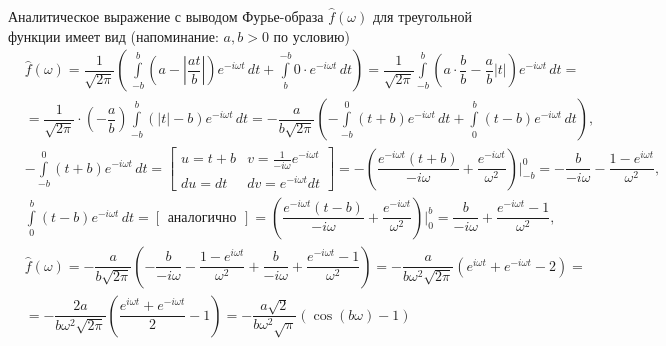 \documentclass[a4paper, 16pt]{article}
\begin{document}
    \noindent Аналитическое выражение с выводом Фурье-образа
    $\hat{f}(\omega)$ для треугольной функции имеет вид (напоминание: $a,b>0$ по условию)
    \begin{align*}
        & \hat{f}(\omega)=\dfrac{1}{\sqrt{2\pi}}\left(\,\int\limits_{-b}^{b}\left(a-\left|\dfrac{at}{b}\right|\right)e^{-i\omega t}\,dt+\int\limits_{b}^{-b}0\cdot e^{-i\omega t}\,dt\right)=
        \dfrac{1}{\sqrt{2\pi}}\int\limits_{-b}^{b}\left(a\cdot\dfrac{b}{b}-\dfrac{a}{b}|t|\right)e^{-i\omega t}\,dt=\\
        & = \dfrac{1}{\sqrt{2\pi}}\cdot\left(-\dfrac{a}{b}\right)\int\limits_{-b}^{b}(|t|-b)e^{-i\omega t}\,dt=-\dfrac{a}{b\sqrt{2\pi}}\left(-\int\limits_{-b}^{0}(t+b)e^{-i\omega t}\,dt+\int\limits_{0}^{b}(t-b)e^{-i\omega t}\,dt\right),\\
        & -\int\limits_{-b}^{0}(t+b)e^{-i\omega t}\,dt=
        \begin{bmatrix}
            u=t+b &v=\frac{1}{-i\omega}e^{-i\omega t}\\
            du=dt &dv=e^{-i\omega t}dt
        \end{bmatrix}=
        -\left(\dfrac{e^{-i\omega t}(t+b)}{-i\omega}+\dfrac{e^{-i\omega t}}{\omega^2}\right)\bigg|_{-b}^{0}=-\dfrac{b}{-i\omega}-\dfrac{1-e^{i\omega t}}{\omega^2},\\
        & \int\limits_{0}^{b}(t-b)e^{-i\omega t}\,dt=
        \begin{bmatrix}
            \text{аналогично}
        \end{bmatrix}=
        \left(\dfrac{e^{-i\omega t}(t-b)}{-i\omega}+\dfrac{e^{-i\omega t}}{\omega^2}\right)\bigg|_{0}^{b}=
        \dfrac{b}{-i\omega}+\dfrac{e^{-i\omega t}-1}{\omega^2},\\
        & \hat{f}(\omega)=-\dfrac{a}{b\sqrt{2\pi}}\left(-\dfrac{b}{-i\omega}-\dfrac{1-e^{i\omega t}}{\omega^2}+\dfrac{b}{-i\omega}+\dfrac{e^{-i\omega t}-1}{\omega^2}\right)=
        -\dfrac{a}{b\omega^2\sqrt{2\pi}}\left(e^{i\omega t}+e^{-i\omega t}-2\right)=\\
        & =-\dfrac{2a}{b\omega^2\sqrt{2\pi}}\left(\dfrac{e^{i\omega t}+e^{-i\omega t}}{2}-1\right)=
        -\dfrac{a\sqrt{2}}{b\omega^2\sqrt{\pi}}\left(\cos{(b\omega)}-1\right)
    \end{align*}
\end{document}
